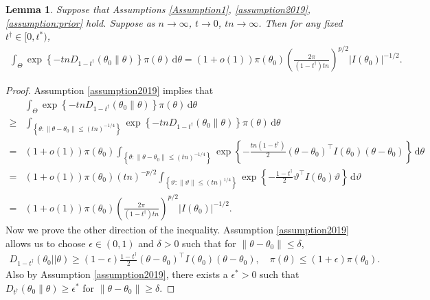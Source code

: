 \documentclass[11pt]{article}
\theoremstyle{plain}
\newtheorem{lemma}{\quad\quad Lemma}
\theoremstyle{definition}
\theoremstyle{remark}
\begin{document}
\begin{appendices}
\begin{lemma}
    Suppose that Assumptions \ref{Assumption1}, \ref{assumption2019}, \ref{assumption:prior} hold.
    Suppose as $n \to \infty$, $t \to 0$, $tn \to \infty$.
    Then for any fixed $t^\dagger \in [0,t^*)$, 
\begin{align*}
    \int_{\Theta} \exp\left\{ -tn D_{1-t^\dagger} \left( \theta_0 \| \theta \right) \right\} \pi(\theta) \, \mathrm d \theta= (1+o(1))\pi(\theta_0)
    \left( 
        \frac{2\pi}{(1-t^\dagger) tn}
    \right)^{p/2}
    | I (\theta_0) |^{-1/2}. 
\end{align*}
    \label{lemma:2019}
\end{lemma}
\begin{proof}
Assumption \ref{assumption2019} implies that
\begin{align*}
    &\int_{\Theta} \exp\left\{ -tn D_{1-t^\dagger} (\theta_0 \| \theta) \right\} \pi(\theta) \, \mathrm d \theta
    \\
    \geq
    &\int_{ \left\{ \theta: \|\theta - \theta_0\|\leq (tn)^{-1/4} \right\}} \exp\left\{ -tn D_{1-t^\dagger} (\theta_0 \| \theta) \right\} \pi(\theta) \, \mathrm d \theta
    \\
    =
    &(1+o(1))\pi(\theta_0)\int_{ \left\{ \theta: \|\theta - \theta_0\|\leq (tn)^{-1/4} \right\}} \exp \left\{ - \frac{tn(1-t^\dagger)}{2} (\theta- \theta_0)^\top I(\theta_0) (\theta- \theta_0) \right\}   \, \mathrm d \theta
    \\
    =
    &(1+o(1))\pi(\theta_0) (tn)^{-p/2} \int_{ \left\{ \vartheta: \|\vartheta\|\leq (tn)^{1/4} \right\}} \exp \left\{ - \frac{1-t^\dagger}{2} \vartheta^\top I(\theta_0) \vartheta \right\} \, \mathrm d \vartheta
    \\
    =
    &(1+o(1))\pi(\theta_0)
    \left( 
        \frac{2\pi}{(1-t^\dagger) tn}
    \right)^{p/2}
    |I(\theta_0)|^{-1/2}
    .
\end{align*}
Now we prove the other direction of the inequality.
Assumption \ref{assumption2019} allows us to choose $\epsilon \in (0,1)$ and $\delta>0$ such that  for $\|\theta- \theta_0\| \leq \delta$,
\begin{align*}
D_{1-t^\dagger} (\theta_0 || \theta) \geq (1-\epsilon) \frac{1-t^\dagger}{2} (\theta -\theta_0)^\top I(\theta_0) (\theta - \theta_0)
,
\quad
\pi(\theta) \leq (1+\epsilon) \pi(\theta_0) 
.
\end{align*}
Also by Assumption \ref{assumption2019}, there exists a $\epsilon^* >0$ such that $D_{t^\dagger} (\theta_0 \| \theta) \geq \epsilon^*$ for $\|\theta - \theta_0\|\geq \delta$.

\end{proof}
\end{appendices}
\end{document}
